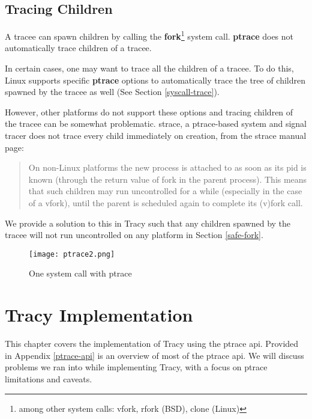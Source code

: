 \documentclass[a4paper, 10pt]{report}
\begin{document}
\section{Tracing Children}

A tracee can spawn children by calling the \textbf{fork}\footnote{among
    other system calls: vfork, rfork (BSD), clone (Linux)} system call. \textbf{ptrace}
does not automatically trace children of a tracee.

In certain cases, one may want to trace all the children of a tracee.
To do this, Linux supports specific \textbf{ptrace} options to automatically
trace the tree of children spawned by the tracee as well (See Section
\ref{syscall-trace}).

However, other platforms do not support these options and tracing
children of the tracee can be somewhat problematic. strace, a
ptrace-based system and signal tracer does not trace every child immediately
on creation, from the strace manual page:

\begin{quote}
    On non-Linux platforms the new process is attached to as soon as its pid is
    known (through the return value of fork in the parent process).
    This means that such children may run uncontrolled for a while
    (especially in the case of a vfork), until the parent is scheduled
    again to complete its (v)fork call.
\end{quote}

We provide a solution to this in Tracy such that any children
spawned by the tracee will not run uncontrolled on any platform
in Section \ref{safe-fork}.


\begin{figure}
\texttt{[image: ptrace2.png]}
\caption{One system call with ptrace}
\label{fig2}
\end{figure}


\chapter{Tracy Implementation}

This chapter covers the implementation of Tracy using the ptrace api. Provided
in Appendix \ref{ptrace-api} is an overview of most of the ptrace api.
We will discuss problems we ran into while implementing Tracy, with a focus on
ptrace limitations and caveats.
\end{document}
